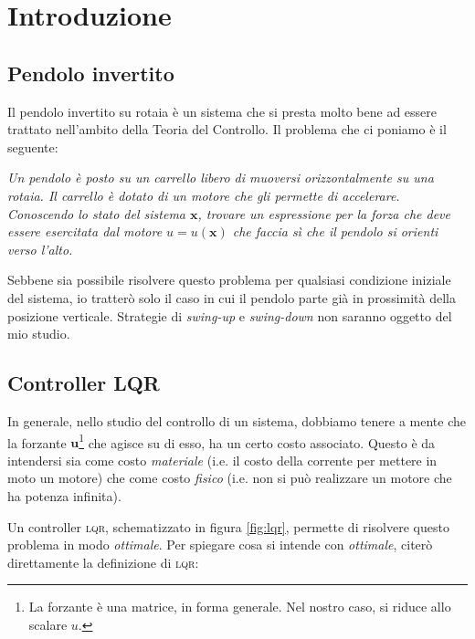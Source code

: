 \section{Introduzione}\label{sec:introduzione}
\subsection{Pendolo invertito}\label{subsec:intro-pendolo}
Il pendolo invertito su rotaia è un sistema che si presta molto bene ad essere trattato nell'ambito della Teoria del
Controllo.
Il problema che ci poniamo è il seguente:
\begin{framed}
\emph{
    Un pendolo è posto su un carrello libero di muoversi orizzontalmente su una rotaia.
    Il carrello è dotato di un motore che gli permette di accelerare. Conoscendo lo stato del sistema
    $\mathbf x$, trovare un espressione per la forza che deve essere esercitata dal motore $u = u(\mathbf x)$
    che faccia sì che il pendolo si orienti verso l'alto.
  }
\end{framed}
Sebbene sia possibile risolvere questo problema per qualsiasi condizione iniziale del sistema, io tratterò solo il
caso in cui il pendolo parte già in prossimità della posizione verticale. Strategie di \emph{swing-up} e
\emph{swing-down} non saranno oggetto del mio studio.

\subsection{Controller \textsc{LQR}}\label{subsec:intro-lqr}
In generale, nello studio del controllo di un sistema, dobbiamo tenere a mente che la forzante
$\mathbf u$\footnote{La forzante è una matrice, in forma generale. Nel nostro caso, si riduce allo scalare $u$.}
che agisce su di esso, ha un certo costo associato.
Questo è da intendersi sia come costo \emph{materiale} (i.e. il costo della corrente per mettere in moto
un motore) che come costo \emph{fisico} (i.e. non si può realizzare un motore che ha potenza
infinita).

Un controller \textsc{lqr}, schematizzato in figura \ref{fig:lqr}, permette di risolvere questo problema in modo \emph{ottimale}.
Per spiegare cosa si intende con \emph{ottimale}, citerò direttamente la definizione di \textsc{lqr}:

